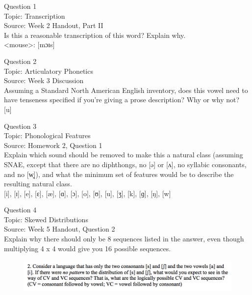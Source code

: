 \documentclass[12pt]{article}
\begin{document}
{\large Question 1}\\

Topic: Transcription\\
Source: Week 2 Handout, Part II\\

Is this a reasonable transcription of this word? Explain why.\\

<mouse>: {[mɔɪs]}


\newpage

{\large Question 2}\\

Topic: Articulatory Phonetics\\
Source: Week 3 Discussion\\

Assuming a Standard North American English inventory, does this vowel need to have tenseness specified if you're giving a prose description? Why or why not?\\

{[u]}


\newpage

{\large Question 3}\\

Topic: Phonological Features\\
Source: Homework 2, Question 1\\

Explain which sound should be removed to make this a natural class (assuming SNAE, except that there are no diphthongs, no [ə] or [ʌ], no syllabic consonants, and no [w̥]), and what the minimum set of features would be to describe the resulting natural class.\\

{[i]}, {[ɪ]}, {[e]}, {[ɛ]}, {[æ]}, {[ɑ]}, {[ɔ]}, {[o]}, {[ʊ]}, {[u]}, {[ʒ]}, {[k]}, {[ɡ]}, {[ŋ]}, {[w]}


\newpage

{\large Question 4}\\

Topic: Skewed Distributions\\
Source: Week 5 Handout, Question 2\\

Explain why there should only be 8 sequences listed in the answer, even though multiplying 4 x 4 would give you 16 possible sequences.\\

\begin{figure}[H]
\includegraphics{../images/skew2.png}
\end{figure}
\end{document}

